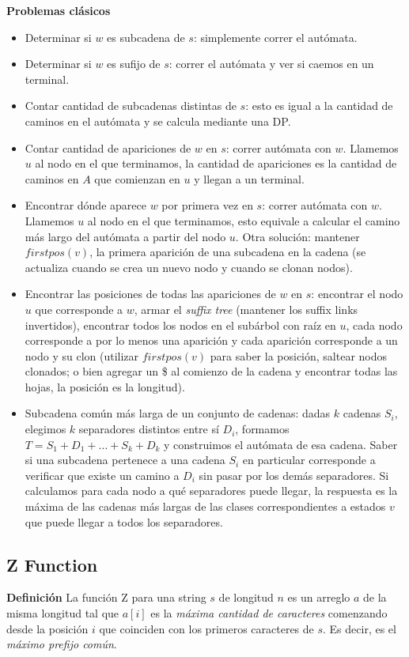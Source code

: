 \textbf{Problemas clásicos}
\begin{itemize}
    \item Determinar si $w$ es subcadena de $s$: simplemente correr el autómata.
    \item Determinar si $w$ es sufijo de $s$: correr el autómata y ver si caemos en un terminal.
    \item Contar cantidad de subcadenas distintas de $s$: esto es igual a la cantidad de
    caminos en el autómata y se calcula mediante una DP.
    \item Contar cantidad de apariciones de $w$ en $s$: correr autómata con $w$. Llamemos $u$
    al nodo en el que terminamos, la cantidad de apariciones es la cantidad de caminos 
    en $A$ que comienzan en $u$ y llegan a un terminal.
    \item Encontrar dónde aparece $w$ por primera vez en $s$: correr autómata con $w$. Llamemos $u$
    al nodo en el que terminamos, esto equivale a calcular el camino más largo del autómata 
    a partir del nodo $u$. Otra solución: mantener $firstpos(v)$, la primera aparición de una subcadena
    en la cadena (se actualiza cuando se crea un nuevo nodo y cuando se clonan nodos).
    \item Encontrar las posiciones de todas las apariciones de $w$ en $s$: encontrar el nodo $u$ que 
    corresponde a $w$, armar el \emph{suffix tree} (mantener los suffix links invertidos), encontrar 
    todos los nodos en el subárbol con raíz en $u$, cada nodo corresponde a por lo menos una aparición 
    y cada aparición corresponde a un nodo y su clon (utilizar $firstpos(v)$ para saber la posición, saltear 
    nodos clonados; o bien agregar un \$ al comienzo de la cadena y encontrar todas las hojas, la posición es
    la longitud). 
    \item Subcadena común más larga de un conjunto de cadenas: dadas $k$ cadenas $S_i$, elegimos
    $k$ separadores distintos entre sí $D_i$, formamos $T = S_1 + D_1 + \dots + S_k + D_k$ y construimos
    el autómata de esa cadena. Saber si una subcadena pertenece a una cadena $S_i$ en particular corresponde 
    a verificar que existe un camino a $D_i$ sin pasar por los demás separadores. Si calculamos para cada nodo
    a qué separadores puede llegar, la respuesta es la máxima de las cadenas más largas de las clases
    correspondientes a estados $v$ que puede llegar a todos los separadores.
\end{itemize}
\subsection{Z Function}
\textbf{Definición}
La función Z para una string $s$ de longitud $n$ es un arreglo $a$ de la misma longitud
tal que $a[i]$ es la \emph{máxima cantidad de caracteres} comenzando desde la posición $i$
que coinciden con los primeros caracteres de $s$. Es decir, es el \emph{máximo prefijo común}.

